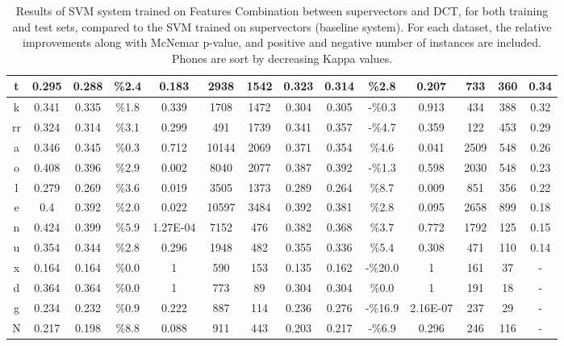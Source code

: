 \begin{table}[H]
{\begin{tabular}{|c| |c|c|c|c|c|c| |c|c|c|c|c|c| |c|}
t & 0.295 & 0.288 & \%2.4 & 0.183 & 2938 & 1542 & 0.323 & 0.314 & \%2.8 & 0.207 & 733 & 360 & 0.34 \\ \hline
k & 0.341 & 0.335 & \%1.8 & 0.339 & 1708 & 1472 & 0.304 & 0.305 & -\%0.3 & 0.913 & 434 & 388 & 0.32 \\ \hline
rr & 0.324 & 0.314 & \%3.1 & 0.299 & 491 & 1739 & 0.341 & 0.357 & -\%4.7 & 0.359 & 122 & 453 & 0.29 \\ \hline
a & 0.346 & 0.345 & \%0.3 & 0.712 & 10144 & 2069 & 0.371 & 0.354 & \%4.6 & 0.041 & 2509 & 548 & 0.26 \\ \hline
\rowcolor{lightgray} o & 0.408 & 0.396 & \%2.9 & 0.002 & 8040 & 2077 & 0.387 & 0.392 & -\%1.3 & 0.598 & 2030 & 548 & 0.23 \\ \hline
\rowcolor{lightgray} l & 0.279 & 0.269 & \%3.6 & 0.019 & 3505 & 1373 & 0.289 & 0.264 & \%8.7 & 0.009 & 851 & 356 & 0.22 \\ \hline
\rowcolor{lightgray} e & 0.4 & 0.392 & \%2.0 & 0.022 & 10597 & 3484 & 0.392 & 0.381 & \%2.8 & 0.095 & 2658 & 899 & 0.18 \\ \hline
\rowcolor{lightgray} n & 0.424 & 0.399 & \%5.9 & 1.27E-04 & 7152 & 476 & 0.382 & 0.368 & \%3.7 & 0.772 & 1792 & 125 & 0.15 \\ \hline
u & 0.354 & 0.344 & \%2.8 & 0.296 & 1948 & 482 & 0.355 & 0.336 & \%5.4 & 0.308 & 471 & 110 & 0.14 \\ \hline
x & 0.164 & 0.164 & \%0.0 & 1 & 590 & 153 & 0.135 & 0.162 & -\%20.0 & 1 & 161 & 37 & - \\ \hline
d & 0.364 & 0.364 & \%0.0 & 1 & 773 & 89 & 0.304 & 0.304 & \%0.0 & 1 & 191 & 18 & - \\ \hline
g & 0.234 & 0.232 & \%0.9 & 0.222 & 887 & 114 & 0.236 & 0.276 & -\%16.9 & 2.16E-07 & 237 & 29 & - \\ \hline
N & 0.217 & 0.198 & \%8.8 & 0.088 & 911 & 443 & 0.203 & 0.217 & -\%6.9 & 0.296 & 246 & 116 & - \\ \hline

\end{tabular}

}
\caption{Results of SVM system trained on Features Combination between supervectors and DCT, 
for both training and test sets, compared to the SVM trained on supervectors (baseline system).
For each dataset, the relative improvements along with McNemar p-value, and
positive and negative number of instances are included. Phones are sort by decreasing Kappa values.}
\label{tab:featuresCombinationAppendixTable}
\end{table}


